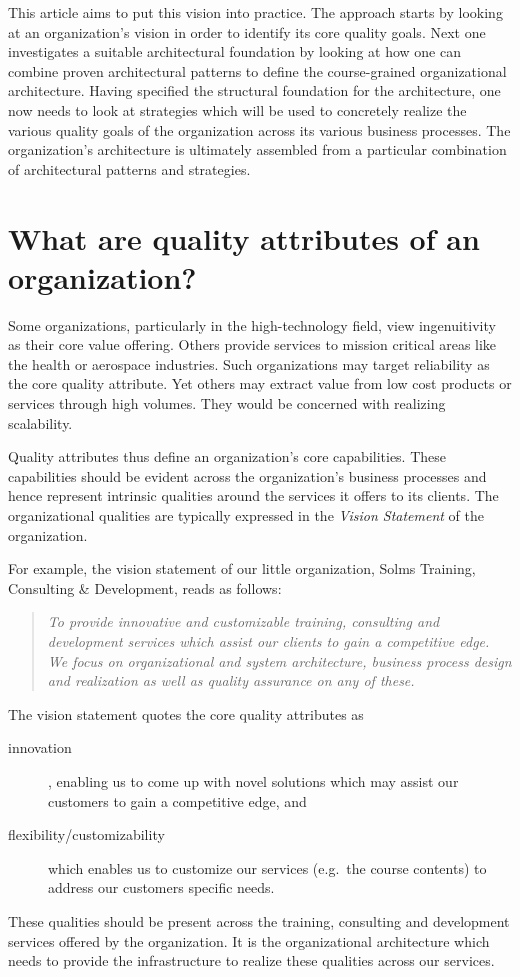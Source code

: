 \documentclass[11pt,english,a4]{article}
\begin{document}
This article aims to put this vision into practice. The approach starts by looking at an organization's vision in order to identify its core quality goals. Next one investigates a suitable architectural foundation by looking at how one can combine proven architectural patterns to define the course-grained organizational architecture. Having specified the structural foundation for the architecture, one now needs to look at strategies which will be used to concretely realize the various quality goals of the organization across its various business processes. The organization's architecture is ultimately assembled from a particular combination of architectural patterns and strategies.

\section{What are quality attributes of an organization?}

Some organizations, particularly in the high-technology field, view ingenuitivity as their core value offering. Others provide services to mission critical areas like the health or aerospace industries. Such organizations may target reliability as the core quality attribute. Yet others may extract value from low cost products or services through high volumes. They would be concerned with realizing scalability.

Quality attributes thus define an organization's core capabilities. These capabilities should be evident across the organization's business processes and hence represent intrinsic qualities around the services it offers to its clients. The organizational qualities are typically expressed in the {\em{Vision Statement}} of the organization.

For example, the vision statement of our little organization, Solms Training, Consulting \& Development, reads as follows: 
\begin{quote}
	{\em{To provide innovative and customizable training, consulting and development services which assist our clients to gain a competitive edge. We focus on organizational and system architecture, business process design and realization as well as quality assurance on any of these.}}
\end{quote}

The vision statement quotes the core quality attributes as
\begin{description}
	\item[innovation],  enabling us to come up with novel solutions which
        may assist our customers to gain a competitive edge, and
	\item[flexibility/customizability] which enables us to customize our services (e.g.\ the course contents) to address our customers specific needs.
\end{description}
\noindent  These qualities should be present across the training, consulting and development services offered by the organization. It is the organizational architecture which needs to provide the infrastructure to realize these qualities across our services.
\end{document}

